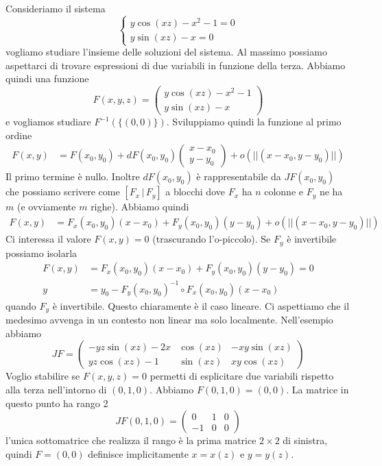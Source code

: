 \documentclass[a4paper]{article}
\begin{document}
Consideriamo il sistema
\[
    \begin{cases}
        y\cos(xz) - x^2 - 1 = 0 \\
        y\sin(xz) - x = 0
    \end{cases}
\]
vogliamo studiare l'insieme delle soluzioni del sistema.
Al massimo possiamo aspettarci di trovare espressioni di due variabili
in funzione della terza.
Abbiamo quindi una funzione
\[
    F(x,y,z) = \begin{pmatrix}
        y\cos(xz) - x^2 - 1 \\
        y\sin(xz) - x
    \end{pmatrix}
\]
e vogliamos studiare \(F^{-1}(\{(0,0)\})\).
Sviluppiamo quindi la funzione al primo ordine
\begin{align*}
    F(x,y) &= F(x_0, y_0)
    + dF(x_0, y_0) \begin{pmatrix}x-x_0 \\ y - y_0\end{pmatrix} + o(||(x-x_0, y-y_0)||)
\end{align*}
Il primo termine è nullo.
Inoltre \(dF(x_0, y_0)\) è rappresentabile da \(JF(x_0, y_0)\)
che possiamo scrivere come \([F_x \,|\, F_y]\) a blocchi
dove \(F_x\) ha \(n\) colonne e \(F_y\) ne ha \(m\) (e ovviamente \(m\) righe).
Abbiamo quindi
\begin{align*}
    F(x,y) &= F_x(x_0, y_0)(x-x_0)
    + F_y(x_0, y_0)(y-y_0) + o(||(x-x_0, y-y_0)||)
\end{align*}
Ci interessa il valore \(F(x,y)=0\) (trascurando l'o-piccolo).
Se \(F_y\) è invertibile possiamo isolarla
\begin{align*}
    F(x,y) &= F_x(x_0, y_0)(x-x_0)
    + F_y(x_0, y_0)(y-y_0) = 0 \\
    y &= y_0 - F_y(x_0, y_0)^{-1} \circ F_x(x_0, y_0)(x-x_0)
\end{align*}
quando \(F_y\) è invertibile.
Questo chiaramente è il caso lineare. Ci aspettiamo che il medesimo
avvenga in un contesto non linear ma solo localmente.
Nell'esempio abbiamo
\[
    JF = \begin{pmatrix}
        -yz\sin(xz)-2x & \cos(xz) & -xy\sin(xz) \\
        yz\cos(xz) - 1 & \sin(xz) & xy\cos(xz)
    \end{pmatrix}
\]
Voglio stabilire se \(F(x,y,z) = 0\) permetti di esplicitare due variabili rispetto alla terza
nell'intorno di \((0,1,0)\). Abbiamo \(F(0,1,0) = (0,0)\).
La matrice in questo punto ha rango 2
\[
    JF(0,1,0) = \begin{pmatrix}
        0 & 1 & 0 \\ -1 & 0 & 0
    \end{pmatrix}
\]
l'unica sottomatrice che realizza il rango è
la prima matrice \(2\times 2\) di sinistra, quindi
\(F=(0,0)\) definisce implicitamente \(x=x(z)\) e \(y=y(z)\).
\end{document}
